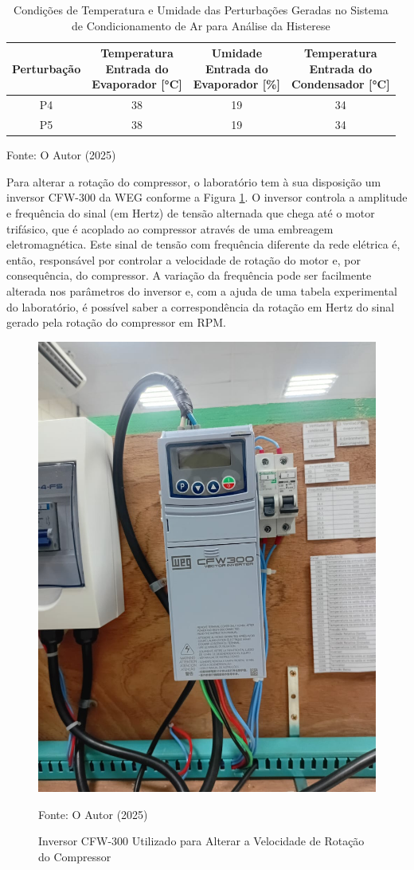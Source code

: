 \begin{table}[htb]
    \centering
\begin{tabular}{|c|c|c|c|}
    \hline
    \textbf{Perturbação} & 
    \makecell{\textbf{Temperatura} \\ \textbf{Entrada do} \\ \textbf{Evaporador [°C]}} &
    \makecell{\textbf{Umidade} \\ \textbf{Entrada do} \\ \textbf{Evaporador [\%]}} &
    \makecell{\textbf{Temperatura} \\ \textbf{Entrada do} \\ \textbf{Condensador [°C]}} \\
        \hline
        P4 & 38 & 19  & 34\\
        P5 & 38 & 19  & 34 \\
        \hline
    \end{tabular}
    \caption{Condições de Temperatura e Umidade das Perturbações Geradas no Sistema de Condicionamento de Ar para Análise da Histerese}
    \vspace{5pt} 
{\footnotesize Fonte: O Autor (2025) }
    \label{tab:pertubaçõesHistereseCondiçõesIniciais}
\end{table}

Para alterar a rotação do compressor, o laboratório \textcite{reve2023} tem à sua disposição um inversor CFW-300 da WEG conforme a Figura \ref{fig:inversor CFW-300}. O inversor controla a amplitude e frequência do sinal (em Hertz) de tensão alternada que chega até o motor trifásico, que é acoplado ao compressor através de uma embreagem eletromagnética. Este sinal de tensão com frequência diferente da rede elétrica é, então, responsável por controlar a velocidade de rotação do motor e, por consequência, do compressor. A variação da frequência pode ser facilmente alterada nos parâmetros do inversor e, com a ajuda de uma tabela experimental do laboratório, é possível saber a correspondência da rotação em Hertz do sinal gerado pela rotação do compressor em RPM.

\begin{figure}[h]
    \centering
    \includegraphics[width=0.45\linewidth]{FigurasdoTexto/inversorcfw-300.jpeg}
    \caption{Inversor CFW-300 Utilizado para Alterar a Velocidade de Rotação do Compressor}
    \label{fig:inversor CFW-300}
    {\footnotesize Fonte: O Autor (2025)}
\end{figure}

